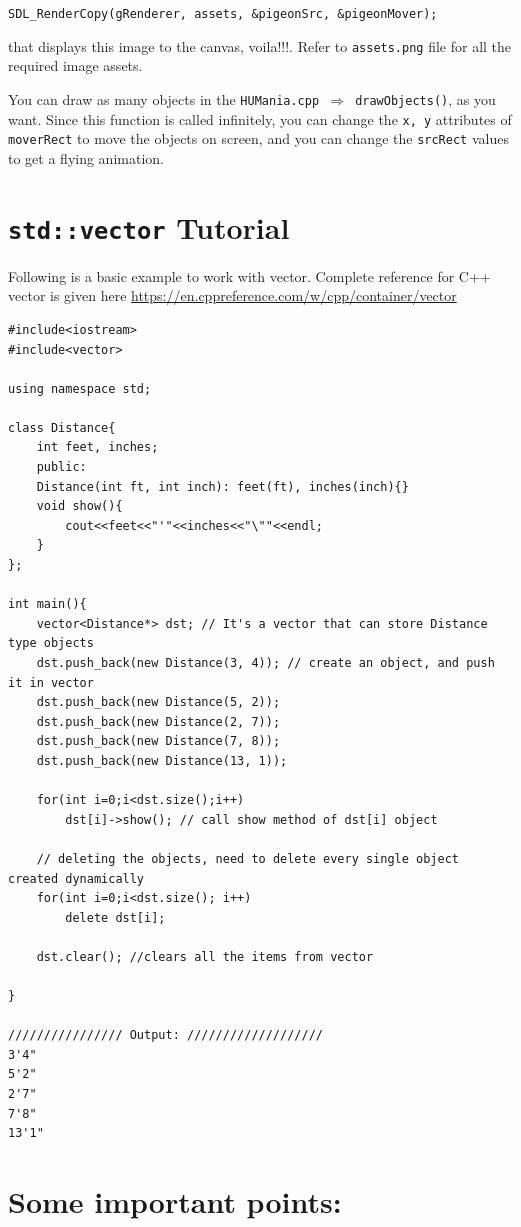 \documentclass[a4paper,12pt]{article}
\begin{document}
	\noindent \texttt{SDL\_RenderCopy(gRenderer, assets, \&pigeonSrc, \&pigeonMover);}
	
	\noindent that displays this image to the canvas, voila!!!. Refer to \texttt{assets.png} file for all the required image assets.
	
	You can draw as many objects in the \texttt{HUMania.cpp $ \Rightarrow $ drawObjects()}, as you want. Since this function is called infinitely, you can change the \texttt{x, y} attributes of \texttt{moverRect} to move the objects on screen, and you can change the \texttt{srcRect} values to get a flying animation.
	


\section{\texttt{std::vector} Tutorial} \label{vectorTutorial}

Following is a basic example to work with vector. Complete reference for C++ vector is given here \url{https://en.cppreference.com/w/cpp/container/vector}
\begin{lstlisting}
#include<iostream>
#include<vector>

using namespace std;

class Distance{
	int feet, inches;
	public:
	Distance(int ft, int inch): feet(ft), inches(inch){}
	void show(){
		cout<<feet<<"'"<<inches<<"\""<<endl;
	}
};

int main(){
	vector<Distance*> dst; // It's a vector that can store Distance type objects
	dst.push_back(new Distance(3, 4)); // create an object, and push it in vector
	dst.push_back(new Distance(5, 2));
	dst.push_back(new Distance(2, 7));
	dst.push_back(new Distance(7, 8));
	dst.push_back(new Distance(13, 1));
	
	for(int i=0;i<dst.size();i++)
		dst[i]->show(); // call show method of dst[i] object
		
	// deleting the objects, need to delete every single object created dynamically
	for(int i=0;i<dst.size(); i++)
		delete dst[i];
	
	dst.clear(); //clears all the items from vector
	
}

//////////////// Output: ///////////////////
3'4"
5'2"
2'7"
7'8"
13'1"
\end{lstlisting}


\section{Some important points:} 
\end{document}
